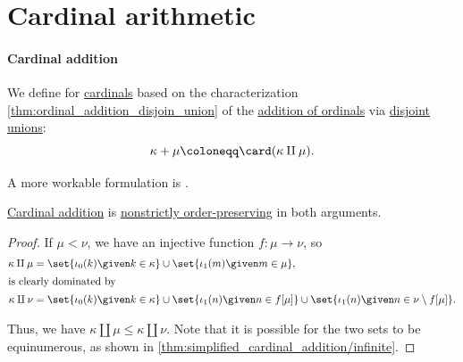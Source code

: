 \section{Cardinal arithmetic}\label{sec:cardinal_arithmetic}

\paragraph{Cardinal addition}

\begin{definition}\label{def:cardinal_addition}
  We define  for \hyperref[def:cardinal]{cardinals} based on the characterization \cref{thm:ordinal_addition_disjoin_union} of the \hyperref[def:ordinal_addition]{addition of ordinals} via \hyperref[def:disjoint_union]{disjoint unions}:
  \begin{equation*}
    \kappa + \mu \coloneqq \card(\kappa \amalg \mu).
  \end{equation*}
\end{definition}
\begin{comments}
  \item A more workable formulation is .
\end{comments}

\begin{proposition}\label{thm:cardinal_addition_is_monotone}
  \hyperref[def:cardinal_addition]{Cardinal addition} is \hyperref[def:order_function/preserving]{nonstrictly order-preserving} in both arguments.
\end{proposition}
\begin{proof}
  If \( \mu < \nu \), we have an injective function \( f: \mu \to \nu \), so
  \begin{align*}
    \kappa \amalg \mu &= \set{ \iota_0(k) \given k \in \kappa } \cup \set{ \iota_1(m) \given m \in \mu }, \\
  \intertext{is clearly dominated by}
    \kappa \amalg \nu &= \set{ \iota_0(k) \given k \in \kappa } \cup \set{ \iota_1(n) \given n \in f[\mu] } \cup \set{ \iota_1(n) \given n \in \nu \setminus f[\mu] }.
  \end{align*}

  Thus, we have \( \kappa \amalg \mu \leq \kappa \amalg \nu \). Note that it is possible for the two sets to be equinumerous, as shown in \cref{thm:simplified_cardinal_addition/infinite}.
\end{proof}

